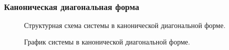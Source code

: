 \documentclass[a5paper, 10pt]{article}
\theoremstyle{definition}
\theoremstyle{plain}
\theoremstyle{remark}
\begin{document}
\newpage
\,
\newpage
\subsubsection{Каноническая диагональная форма}

\begin{figure}[h]
\caption{Структурная схема системы в канонической диагональной форме.}
\end{figure}

\begin{figure}[h]
\caption{График системы в канонической диагональной форме.}
\end{figure}
\end{document}
